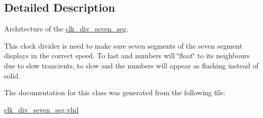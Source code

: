 \subsection{Detailed Description}
Architecture of the \hyperlink{classclk__div__seven__seg}{clk\-\_\-div\-\_\-seven\-\_\-seg}. 

This clock divider is need to make sure seven segments of the seven segment displays in the correct speed. To fast and numbers will \char`\"{}float\char`\"{} to its neighbours due to slow trancients, to slow and the numbers will appear as flashing instead of solid. 

The documentation for this class was generated from the following file\-:\begin{DoxyCompactItemize}
\item 
\hyperlink{clk__div__seven__seg_8vhd}{clk\-\_\-div\-\_\-seven\-\_\-seg.\-vhd}\end{DoxyCompactItemize}

